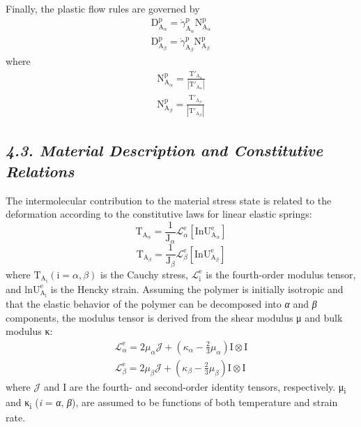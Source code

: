 \documentclass{article}
\begin{document}
Finally, the plastic flow rules are governed by
\begin{gather*}
\mathrm{D}^{\mathrm{p}}_{\mathrm{A}_\alpha} = \dot{\gamma}^{\mathrm{p}}_{\mathrm{A}_\alpha}\mathrm{N}^{\mathrm{p}}_{\mathrm{A}_\alpha} \tag{18}\\
\mathrm{D}^{\mathrm{p}}_{\mathrm{A}_\beta} = \dot{\gamma}^{\mathrm{p}}_{\mathrm{A}_\beta}\mathrm{N}^{\mathrm{p}}_{\mathrm{A}_\beta} \tag{19}
\end{gather*}
\noindent where
\begin{gather*}
\mathrm{N}^{\mathrm{p}}_{\mathrm{A}_\alpha} = \frac{\mathrm{T}'_{\mathrm{A}_\alpha}}{\left|\mathrm{T}'_{\mathrm{A}_\alpha}\right|} \tag{20}\\
\mathrm{N}^{\mathrm{p}}_{\mathrm{A}_\beta} = \frac{\mathrm{T}'_{\mathrm{A}_\beta}}{\left|\mathrm{T}'_{\mathrm{A}_\beta}\right|} \tag{21}
\end{gather*}

\subsection*{\emph{4.3. Material Description and Constitutive Relations}}

The intermolecular contribution to the material stress state is related to the deformation according to the constitutive laws for linear elastic springs:
\begin{equation*}
\mathrm{T}_{\mathrm{A}_\alpha} = \frac{1}{\mathrm{J}_\alpha}\mathcal{L}^{\mathrm{e}}_\alpha\left[\mathrm{InU}^{\mathrm{e}}_{\mathrm{A}_\alpha}\right] \tag{22}
\end{equation*}
\begin{equation*}
\mathrm{T}_{\mathrm{A}_\beta} = \frac{1}{\mathrm{J}_\beta}\mathcal{L}^{\mathrm{e}}_\beta\left[\mathrm{InU}^{\mathrm{e}}_{\mathrm{A}_\beta}\right] \tag{23}
\end{equation*}
\noindent where $\mathrm{T}_{\mathrm{A}_\mathrm{i}}(\mathrm{i} = \alpha, \beta)$ is the Cauchy stress, $\mathcal{L}^{\mathrm{e}}_{\mathrm{i}}$ is the fourth-order modulus tensor, and $\mathrm{lnU}^{\mathrm{e}}_{\mathrm{A}_\mathrm{i}}$ is the Hencky strain. Assuming the polymer is initially isotropic and that the elastic behavior of the polymer can be decomposed into \emph{α} and \emph{β} components, the modulus tensor is derived from the shear modulus μ and bulk modulus κ:
\begin{gather*}
\mathcal{L}^{\mathrm{e}}_\alpha = 2\mu_\alpha\mathcal{J} + (\kappa_\alpha - \frac{2}{3}\mu_\alpha)\mathrm{I}\otimes\mathrm{I} \tag{24}\\
\mathcal{L}^{\mathrm{e}}_\beta = 2\mu_\beta\mathcal{J} + (\kappa_\beta - \frac{2}{3}\mu_\beta)\mathrm{I}\otimes\mathrm{I} \tag{25}
\end{gather*}
\noindent where $\mathcal{J}$ and I are the fourth- and second-order identity tensors, respectively. μ\textsubscript{i} and κ\textsubscript{i} (\emph{i} = \emph{α}, \emph{β}), are assumed to be functions of both temperature and strain rate.
\end{document}
